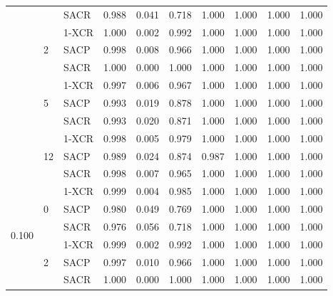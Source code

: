 \begin{longtable}[c]{|l|l|l|l|l|l|l|l|l|l|}
                        &                     & SACR   & 0.988 & 0.041 & 0.718 & 1.000 & 1.000 & 1.000 & 1.000 \\ \cline{2-10} 
                        & \multirow{3}{*}{2}  & 1-XCR  & 1.000 & 0.002 & 0.992 & 1.000 & 1.000 & 1.000 & 1.000 \\ \cline{3-10} 
                        &                     & SACP   & 0.998 & 0.008 & 0.966 & 1.000 & 1.000 & 1.000 & 1.000 \\ \cline{3-10} 
                        &                     & SACR   & 1.000 & 0.000 & 1.000 & 1.000 & 1.000 & 1.000 & 1.000 \\ \cline{2-10} 
                        & \multirow{3}{*}{5}  & 1-XCR  & 0.997 & 0.006 & 0.967 & 1.000 & 1.000 & 1.000 & 1.000 \\ \cline{3-10} 
                        &                     & SACP   & 0.993 & 0.019 & 0.878 & 1.000 & 1.000 & 1.000 & 1.000 \\ \cline{3-10} 
                        &                     & SACR   & 0.993 & 0.020 & 0.871 & 1.000 & 1.000 & 1.000 & 1.000 \\ \cline{2-10} 
                        & \multirow{3}{*}{12} & 1-XCR  & 0.998 & 0.005 & 0.979 & 1.000 & 1.000 & 1.000 & 1.000 \\ \cline{3-10} 
                        &                     & SACP   & 0.989 & 0.024 & 0.874 & 0.987 & 1.000 & 1.000 & 1.000 \\ \cline{3-10} 
                        &                     & SACR   & 0.998 & 0.007 & 0.965 & 1.000 & 1.000 & 1.000 & 1.000 \\ \hline
\multirow{12}{*}{0.100} & \multirow{3}{*}{0}  & 1-XCR  & 0.999 & 0.004 & 0.985 & 1.000 & 1.000 & 1.000 & 1.000 \\ \cline{3-10} 
                        &                     & SACP   & 0.980 & 0.049 & 0.769 & 1.000 & 1.000 & 1.000 & 1.000 \\ \cline{3-10} 
                        &                     & SACR   & 0.976 & 0.056 & 0.718 & 1.000 & 1.000 & 1.000 & 1.000 \\ \cline{2-10} 
                        & \multirow{3}{*}{2}  & 1-XCR  & 0.999 & 0.002 & 0.992 & 1.000 & 1.000 & 1.000 & 1.000 \\ \cline{3-10} 
                        &                     & SACP   & 0.997 & 0.010 & 0.966 & 1.000 & 1.000 & 1.000 & 1.000 \\ \cline{3-10} 
                        &                     & SACR   & 1.000 & 0.000 & 1.000 & 1.000 & 1.000 & 1.000 & 1.000 \\ \cline{2-10} 

\end{longtable}
